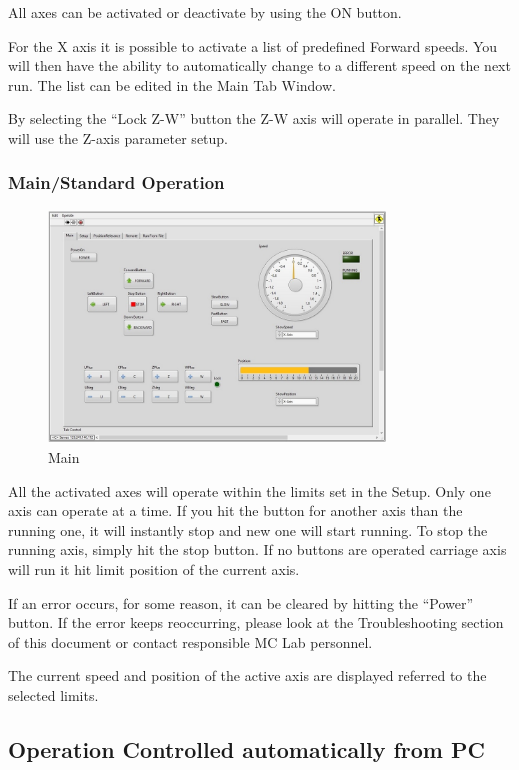 \documentclass[a4paper,english]{report}
\begin{document}
All axes can be activated or deactivate by using the ON button.

For the X axis it is possible to activate a list of predefined Forward speeds. You will then have the ability to automatically change to a different speed on the next run. The list can be edited in the Main Tab Window.

By selecting the ``Lock Z-W'' button the Z-W axis will operate in parallel. They will use the Z-axis parameter setup.

\subsubsection*{Main/Standard Operation}
\begin{figure}[htb!]
	\centering \includegraphics[width=0.8\textwidth]{fig/towing_main} 
	\caption{Main}
	\label{fig: Towing main}
\end{figure}

All the activated axes will operate within the limits set in the Setup. Only one axis can operate at a time. If you hit the button for another axis than the running one, it will instantly stop and new one will start running. To stop the running axis, simply hit the stop button. If no buttons are operated carriage axis will run it hit limit position of the current axis.

If an error occurs, for some reason, it can be cleared by hitting the ``Power'' button. If the error keeps reoccurring, please look at the Troubleshooting section of this document or contact responsible MC Lab personnel.

The current speed and position of the active axis are displayed referred to the selected limits.

\subsection{Operation Controlled automatically from PC}
\end{document}
